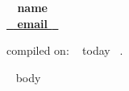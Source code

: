 \documentclass[11pt,english]{article}
\begin{document}

\begin{center}
\huge\bf\color{maincolor} ~{{ name }}~  \\
\small\color{black} \href{mailto: ~{{ email }}~ }{ ~{{ email }}~ } 
\end{center}
\href{https://twitter.com/kwcooper}{\faTwitter} 

\begin{flushright}
\vspace{3.5mm}
\tiny compiled on: ~{{ today }}~.
\end{flushright}

\vspace{-18mm}


~{{ body }}~
\end{document}
